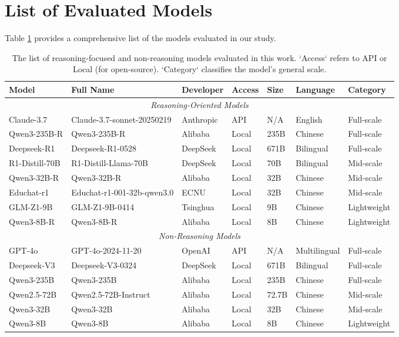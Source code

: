 \documentclass[letterpaper]{article} %
\begin{document}
\section{List of Evaluated Models}
\label{app:model_list}

Table \ref{tab:model_list} provides a comprehensive list of the models evaluated in our study.

\begin{table}[ht!]
\centering
\caption{The list of reasoning-focused and non-reasoning models evaluated in this work. `Access` refers to API or Local (for open-source). `Category` classifies the model's general scale.}
\label{tab:model_list}
\begin{tabular}{lllllll}
\toprule
\textbf{Model} & \textbf{Full Name} & \textbf{Developer} & \textbf{Access} & \textbf{Size} & \textbf{Language} & \textbf{Category} \\
\midrule
\multicolumn{7}{c}{\textit{Reasoning-Oriented Models}} \\
\midrule
Claude-3.7 & Claude-3.7-sonnet-20250219 & Anthropic & API & N/A & English & Full-scale \\
Qwen3-235B-R & Qwen3-235B-R & Alibaba & Local & 235B & Chinese & Full-scale \\
Deepseek-R1 & Deepseek-R1-0528 & DeepSeek & Local & 671B & Bilingual & Full-scale \\
R1-Distill-70B & R1-Distill-Llama-70B & DeepSeek & Local & 70B & Bilingual & Mid-scale \\
Qwen3-32B-R & Qwen3-32B-R & Alibaba & Local & 32B & Chinese & Mid-scale \\
Educhat-r1 & Educhat-r1-001-32b-qwen3.0 & ECNU & Local & 32B & Chinese & Mid-scale \\
GLM-Z1-9B & GLM-Z1-9B-0414 & Tsinghua & Local & 9B & Chinese & Lightweight \\
Qwen3-8B-R & Qwen3-8B-R & Alibaba & Local & 8B & Chinese & Lightweight \\
\midrule
\multicolumn{7}{c}{\textit{Non-Reasoning Models}} \\
\midrule
GPT-4o & GPT-4o-2024-11-20 & OpenAI & API & N/A & Multilingual & Full-scale \\
Deepseek-V3 & Deepseek-V3-0324 & DeepSeek & Local & 671B & Bilingual & Full-scale \\
Qwen3-235B & Qwen3-235B & Alibaba & Local & 235B & Chinese & Full-scale \\
Qwen2.5-72B & Qwen2.5-72B-Instruct & Alibaba & Local & 72.7B & Chinese & Mid-scale \\
Qwen3-32B & Qwen3-32B & Alibaba & Local & 32B & Chinese & Mid-scale \\
Qwen3-8B & Qwen3-8B & Alibaba & Local & 8B & Chinese & Lightweight \\
\bottomrule
\end{tabular}
\end{table}
\end{document}
